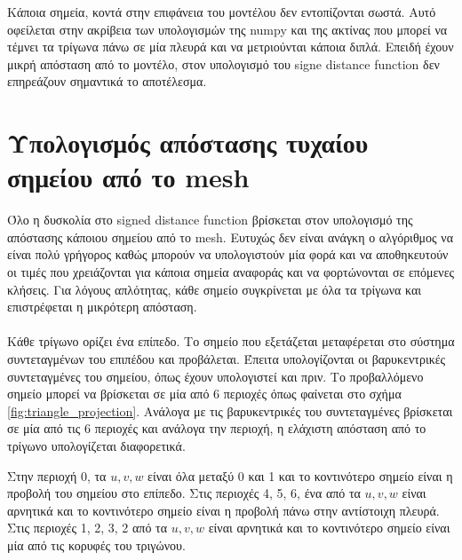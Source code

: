 \documentclass{report}
\begin{document}

Κάποια σημεία, κοντά στην επιφάνεια του μοντέλου δεν εντοπίζονται σωστά. Αυτό οφείλεται στην ακρίβεια των υπολογισμών της numpy
και της ακτίνας που μπορεί να τέμνει τα τρίγωνα πάνω σε μία πλευρά και να μετριούνται κάποια διπλά. Επειδή έχουν μικρή
απόσταση από το μοντέλο, στον υπολογισμό του signe distance function δεν επηρεάζουν σημαντικά το αποτέλεσμα.


\section{Υπολογισμός απόστασης τυχαίου σημείου από το mesh}
Όλο η δυσκολία στο signed distance function βρίσκεται στον υπολογισμό της απόστασης κάποιου σημείου από το mesh.
Ευτυχώς δεν είναι ανάγκη ο αλγόριθμος να είναι πολύ γρήγορος καθώς μπορούν να υπολογιστούν μία φορά και να
αποθηκευτούν οι τιμές που χρειάζονται για κάποια σημεία αναφοράς και να φορτώνονται σε επόμενες κλήσεις.
Για λόγους απλότητας, κάθε σημείο συγκρίνεται με όλα τα τρίγωνα και επιστρέφεται η μικρότερη απόσταση.
\\\\
Κάθε τρίγωνο ορίζει ένα επίπεδο. Το σημείο που εξετάζεται μεταφέρεται στο σύστημα συντεταγμένων του επιπέδου και προβάλεται.
Έπειτα υπολογίζονται οι βαρυκεντρικές συντεταγμένες του σημείου, όπως έχουν υπολογιστεί και πριν.
Το προβαλλόμενο σημείο μπορεί να βρίσκεται σε μία από 6 περιοχές όπως φαίνεται στο σχήμα \ref{fig:triangle_projection}.
Ανάλογα με τις βαρυκεντρικές του συντεταγμένες βρίσκεται σε μία από τις 6 περιοχές και ανάλογα την περιοχή,
η ελάχιστη απόσταση από το τρίγωνο υπολογίζεται διαφορετικά.

 \label{fig:triangle_projection}

Στην περιοχή 0, τα $u, v, w$ είναι όλα μεταξύ 0 και 1 και το κοντινότερο σημείο είναι η προβολή του σημείου στο επίπεδο.
Στις περιοχές 4, 5, 6, ένα από τα $u, v, w$ είναι αρνητικά και το κοντινότερο σημείο είναι η προβολή πάνω στην
αντίστοιχη πλευρά. Στις περιοχές 1, 2, 3, 2 από τα $u, v, w$ είναι αρνητικά και το κοντινότερο σημείο 
είναι μία από τις κορυφές του τριγώνου.

\end{document}
